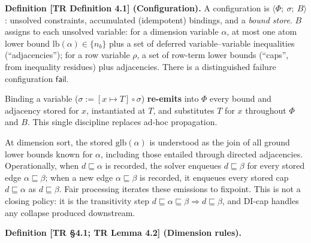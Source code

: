 \documentclass[
  10pt,
  letterpaper,
]{article}
\begin{document}
\textbf{Definition {[}TR Definition 4.1{]} (Configuration).} A
configuration is \(\langle \Phi;\ \sigma;\ B \rangle\): unsolved
constraints, accumulated (idempotent) bindings, and a \emph{bound
store}. \(B\) assigns to each unsolved variable: for a dimension
variable \(\alpha\), at most one atom lower bound
\(\mathrm{lb}(\alpha) \in \{n_b\}\) plus a set of deferred
variable--variable inequalities (``adjacencies''); for a row variable
\(\rho\), a set of row-term lower bounds (``caps'', from inequality
residues) plus adjacencies. There is a distinguished failure
configuration \(\mathsf{fail}\).

Binding a variable (\(\sigma := [x \mapsto T] \circ \sigma\))
\textbf{re-emits} into \(\Phi\) every bound and adjacency stored for
\(x\), instantiated at \(T\), and substitutes \(T\) for \(x\) throughout
\(\Phi\) and \(B\). This single discipline replaces ad-hoc propagation.

At dimension sort, the stored \(\mathrm{glb}(\alpha)\) is understood as
the join of all ground lower bounds known for \(\alpha\), including
those entailed through directed adjacencies. Operationally, when
\(d \sqsubseteq \alpha\) is recorded, the solver enqueues
\(d \sqsubseteq \beta\) for every stored edge
\(\alpha \sqsubseteq \beta\); when a new edge
\(\alpha \sqsubseteq \beta\) is recorded, it enqueues every stored cap
\(d \sqsubseteq \alpha\) as \(d \sqsubseteq \beta\). Fair processing
iterates these emissions to fixpoint. This is not a closing policy: it
is the transitivity step
\(d \sqsubseteq \alpha \sqsubseteq \beta \Rightarrow d \sqsubseteq \beta\),
and DI-cap handles any collapse produced downstream.

\textbf{Definition {[}TR §4.1; TR Lemma 4.2{]} (Dimension rules).}
\end{document}
